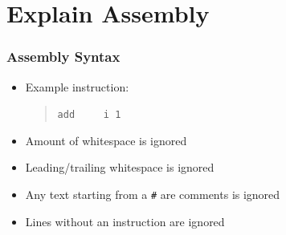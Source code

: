 	\section{Explain Assembly}

	\begin{frame}
		\frametitle{Assembly Syntax}

		\begin{itemize}
			\item Example instruction:
				\begin{quote}
					\texttt{add~~~~~i 1}
				\end{quote}
			\item Amount of whitespace is ignored
			\item Leading/trailing whitespace is ignored
			\item Any text starting from a \texttt{\#} are comments is ignored
			\item Lines without an instruction are ignored
		\end{itemize}

	\end{frame}

